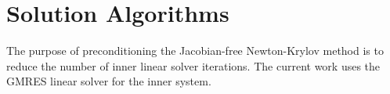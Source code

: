 \documentclass[sn-mathphys,Numbered]{sn-jnl}%
\newcommand{\bb}{\boldsymbol}
\begin{document}



\section{Solution Algorithms}\label{sec:sol_alg}


%


The purpose of preconditioning the Jacobian-free Newton-Krylov method is to reduce the number of inner linear solver iterations.
The current work uses the GMRES linear solver for the inner system.
\end{document}
